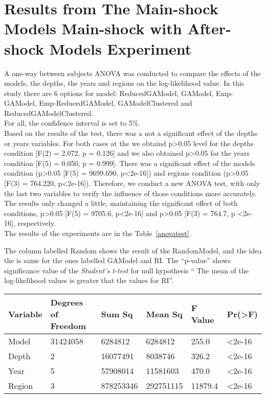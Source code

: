 \section{Results from The Main-shock Models Main-shock with After-shock Models Experiment}
A one-way between subjects ANOVA was conducted to compare the effects of the models, the depths, the years and regions on the log-likelihood value. In this study there are 6 options for model: ReducedGAModel, GAModel, Emp-GAModel, Emp-ReducedGAModel, GAModelClustered and ReducedGAModelClustered. \\

For all, the confidence interval is set to 5\%.\\

Based on the results of the test, there was a not a significant effect of the depths or years variables. For both cases at the we obtaind p>0.05 level for the depths condition [F(2) = 2.072, p = 0.126] and we also obtained p>0.05 for the years condition  [F(5) = 0.050, p = 0.999]. There was a significant effect of the models condition (p>0.05 [F(5) = 9699.690, p<2e-16]) and regions condition (p>0.05 [F(3) = 764.220, p<2e-16]). Therefore, we conduct a new ANOVA test, with only the last two variables to verify the influence of those conditions more accurately. The results only changed a little, maintaining the significant effect of both conditions, p>0.05 [F(5) = 9705.6, p<2e-16] and p>0.05 [F(3) = 764.7, p <2e-16], respectively.\\

The results of the experiments are in the Table~\ref{anovatest}. 

The column labelled Random shows the result of the RandomModel, and the idea the is same for the ones labelled GAModel and RI. The ``p-value'' shows significance value of the {\it Student's t-test} for null hypothesis `` The mean of the log-likelihood values is greater that the values for RI''.\\

\begin{table*}[!ht]
	\centering
	\begin{tabular}{|l|l|l|l|l|l|}
		\hline
		{Variable} & {Degrees of Freedom} & {Sum Sq}    & {Mean Sq}   & {F Value} & {Pr(\textgreater F)} \\
		\hline
		Model    & 31424058           & 6284812   & 6284812   & 255.0   & \textless2e-16     \\
		\hline
		Depth    & 2                  & 16077491  & 8038746   & 326.2   & \textless2e-16     \\
		\hline
		Year     & 5                  & 57908014  & 11581603  & 470.0   & \textless2e-16     \\
		\hline
		Region   & 3                  & 878253346 & 292751115 & 11879.4 & \textless2e-16\\    
		\hline
	\end{tabular}
	\caption{Simple ANOVA Test Results.}
	\label{anovatest}
\end{table*}

